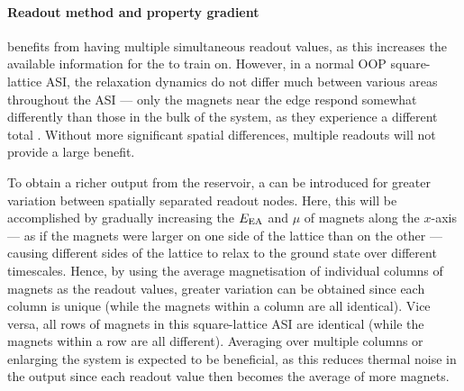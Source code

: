 \paragraph{Readout method and property gradient}
 benefits from having multiple simultaneous readout values, as this increases the available information for the  to train on.
However, in a normal OOP square-lattice ASI, the relaxation dynamics do not differ much between various areas throughout the ASI --- only the magnets near the edge respond somewhat differently than those in the bulk of the system, as they experience a different total .
Without more significant spatial differences, multiple readouts will not provide a large benefit. \\\par
To obtain a richer output from the reservoir, a  can be introduced for greater variation between spatially separated readout nodes. %
Here, this will be accomplished by gradually increasing the  $E_\mathrm{EA}$ and  $\mu$ of magnets along the $x$-axis --- as if the magnets were larger on one side of the lattice than on the other --- causing different sides of the lattice to relax to the ground state over different timescales.
Hence, by using the average magnetisation of individual columns of magnets as the readout values, greater variation can be obtained since each column is unique (while the magnets within a column are all identical).
Vice versa, all rows of magnets in this square-lattice ASI are identical (while the magnets within a row are all different).
Averaging over multiple columns or enlarging the system is expected to be beneficial, as this reduces thermal noise in the output since each readout value then becomes the average of more magnets.

